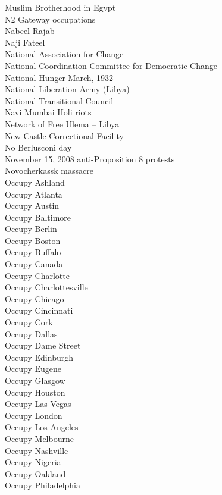 Muslim Brotherhood in Egypt\\
N2 Gateway occupations\\
Nabeel Rajab\\
Naji Fateel\\
National Association for Change\\
National Coordination Committee for Democratic Change\\
National Hunger March, 1932\\
National Liberation Army (Libya)\\
National Transitional Council\\
Navi Mumbai Holi riots\\
Network of Free Ulema – Libya\\
New Castle Correctional Facility\\
No Berlusconi day\\
November 15, 2008 anti-Proposition 8 protests\\
Novocherkassk massacre\\
Occupy Ashland\\
Occupy Atlanta\\
Occupy Austin\\
Occupy Baltimore\\
Occupy Berlin\\
Occupy Boston\\
Occupy Buffalo\\
Occupy Canada\\
Occupy Charlotte\\
Occupy Charlottesville\\
Occupy Chicago\\
Occupy Cincinnati\\
Occupy Cork\\
Occupy Dallas\\
Occupy Dame Street\\
Occupy Edinburgh\\
Occupy Eugene\\
Occupy Glasgow\\
Occupy Houston\\
Occupy Las Vegas\\
Occupy London\\
Occupy Los Angeles\\
Occupy Melbourne\\
Occupy Nashville\\
Occupy Nigeria\\
Occupy Oakland\\
Occupy Philadelphia\\
